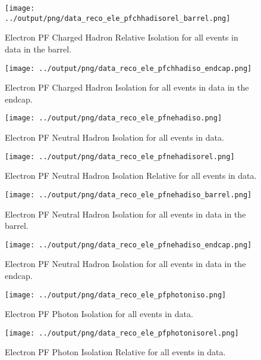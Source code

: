 \documentclass[11pt]{book}
\begin{document}
\begin{figure}[htb]
\centering
\texttt{[image: ../output/png/data\_reco\_ele\_pfchhadisorel\_barrel.png]}
\caption{Electron PF Charged Hadron Relative Isolation for all events in data in the barrel.}
\label{fig:data_ele_pfchhadisorel_barrel}
\end{figure}

\begin{figure}[htb]
\centering
\texttt{[image: ../output/png/data\_reco\_ele\_pfchhadiso\_endcap.png]}
\caption{Electron PF Charged Hadron Isolation for all events in data in the endcap.}
\label{fig:data_ele_pfchhadiso_endcap}
\end{figure}


\begin{figure}[htb]
\centering
\texttt{[image: ../output/png/data\_reco\_ele\_pfnehadiso.png]}
\caption{Electron PF Neutral Hadron Isolation for all events in data.}
\label{fig:data_ele_pfnehadiso}
\end{figure}

\begin{figure}[htb]
\centering
\texttt{[image: ../output/png/data\_reco\_ele\_pfnehadisorel.png]}
\caption{Electron PF Neutral Hadron Isolation Relative for all events in data.}
\label{fig:data_ele_pfnehadisorel}
\end{figure}

\begin{figure}[htb]
\centering
\texttt{[image: ../output/png/data\_reco\_ele\_pfnehadiso\_barrel.png]}
\caption{Electron PF Neutral Hadron Isolation for all events in data in the barrel.}
\label{fig:data_ele_pfnehadiso_barrel}
\end{figure}

\begin{figure}[htb]
\centering
\texttt{[image: ../output/png/data\_reco\_ele\_pfnehadiso\_endcap.png]}
\caption{Electron PF Neutral Hadron Isolation for all events in data in the endcap.}
\label{fig:data_ele_pfnehadiso_endcap}
\end{figure}


\begin{figure}[htb]
\centering
\texttt{[image: ../output/png/data\_reco\_ele\_pfphotoniso.png]}
\caption{Electron PF Photon Isolation for all events in data.}
\label{fig:data_ele_pfphotoniso}
\end{figure}

\begin{figure}[htb]
\centering
\texttt{[image: ../output/png/data\_reco\_ele\_pfphotonisorel.png]}
\caption{Electron PF Photon Isolation Relative for all events in data.}
\label{fig:data_ele_pfphotonisorel}
\end{figure}
\end{document}
